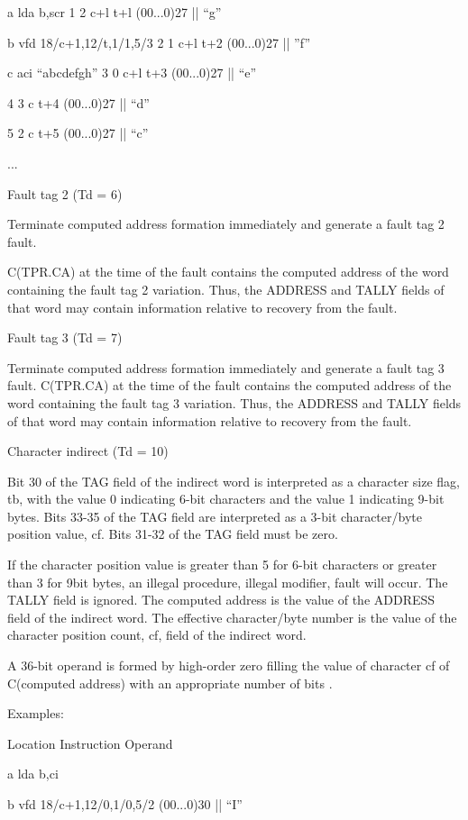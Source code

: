 a lda b,scr 1 2 c+l t+l (00...0)27 || {``}g''

b vfd 18/c+1,12/t,1/1,5/3 2 1 c+l t+2 (00...0)27 || ''f''

c aci {``}abcdefgh'' 3 0 c+l t+3 (00...0)27 || {``}e''

4 3 c t+4 (00...0)27 || {``}d''

5 2 c t+5 (00...0)27 || {``}c''

...


Fault tag 2 (Td = 6)


Terminate computed address formation immediately and generate a fault tag 2
fault.


C(TPR.CA) at the time of the fault contains the computed address of the word
containing the fault tag 2 variation. Thus, the ADDRESS and TALLY fields of
that word may contain information relative to recovery from the fault.


Fault tag 3 (Td = 7)

Terminate computed address formation immediately and generate a fault tag 3
fault.  C(TPR.CA) at the time of the fault contains the computed address of the
word containing the fault tag 3 variation. Thus, the ADDRESS and TALLY fields
of that word may contain information relative to recovery from the fault.  

Character indirect (Td = 10)

Bit 30 of the TAG field of the indirect word is interpreted as a character size
flag, tb, with the value 0 indicating 6-bit characters and the value 1
indicating 9-bit bytes. Bits 33-35 of the TAG field are interpreted as a 3-bit
character/byte position value, cf. Bits 31-32 of the TAG field must be zero.

If the character position value is greater than 5 for 6-bit characters or
greater than 3 for 9bit bytes, an illegal procedure, illegal modifier, fault
will occur. The TALLY field is ignored.  The computed address is the value of
the ADDRESS field of the indirect word. The effective character/byte number is
the value of the character position count, cf, field of the indirect word.

A 36-bit operand is formed by high-order zero filling the value of character cf
of C(computed address) with an appropriate number of bits .


Examples:

Location Instruction Operand

a lda b,ci

b vfd 18/c+1,12/0,1/0,5/2 (00...0)30 || {``}I''


